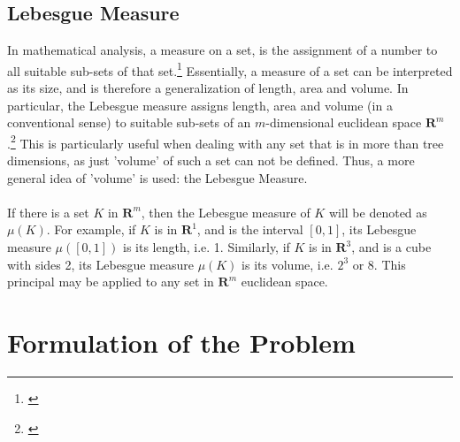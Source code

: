 \documentclass[11pt,a4paper]{article}
\numberwithin{equation}{subsection}
\begin{document}
\subsection{Lebesgue Measure} \label{measure}
In mathematical analysis, a measure on a set, is the assignment of a number to all suitable sub-sets of that set.\footnote{\cite{cortzen_weisstein}} Essentially, a measure of a set can be interpreted as its size, and is therefore a generalization of length, area and volume. In particular, the Lebesgue measure assigns length, area and volume (in a conventional sense) to suitable sub-sets of an $m$-dimensional euclidean space $\boldsymbol{R}^m$.\footnote{\cite{lebesgue_1902}} This is particularly useful when dealing with any set that is in more than tree dimensions, as just 'volume' of such a set can not be defined. Thus, a more general idea of 'volume' is used: the Lebesgue Measure.\\
\\
If there is a set $K$ in $\boldsymbol{R}^m$, then the Lebesgue measure of $K$ will be denoted as $\mu(K)$. For example, if $K$ is in $\boldsymbol{R}^1$, and is the interval $[0,1]$, its Lebesgue measure $\mu([0,1])$ is its length, i.e. 1. Similarly, if $K$ is in $\boldsymbol{R}^3$, and is a cube with sides 2, its Lebesgue measure $\mu(K)$ is its volume, i.e. $2^3$ or 8. This principal may be applied to any set in $\boldsymbol{R}^m$ euclidean space.

\section{Formulation of the Problem} \label{formulation}
\end{document}
